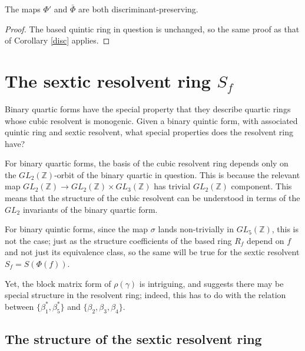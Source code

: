 \documentclass{report}
\begin{document}
\begin{corollary}
The maps $\Phi'$ and $\bar{\Phi}$ are both discriminant-preserving.
\end{corollary}
\begin{proof}
The based quintic ring in question is unchanged, so the same proof as that of Corollary \ref{disc} applies.
\end{proof}








\chapter{The sextic resolvent ring $S_f$} \label{sextic section}

Binary quartic forms have the special property that they describe quartic rings whose cubic resolvent is monogenic.  Given a binary quintic form, with associated quintic ring and sextic resolvent, what special properties does the resolvent ring have?

For binary quartic forms, the basis of the cubic resolvent ring depends only on the $GL_2(\mathbb{Z})$-orbit of the binary quartic in question.  This is because the relevant map $GL_2(\mathbb{Z}) \to GL_2(\mathbb{Z}) \times GL_3(\mathbb{Z})$ has trivial $GL_2(\mathbb{Z})$ component.  This means that the structure of the cubic resolvent can be understood in terms of the $GL_2$ invariants of the binary quartic form.

For binary quintic forms, since the map $\sigma$ lands non-trivially in $GL_5(\mathbb{Z})$, this is not the case; just as the structure coefficients of the based ring $R_f$ depend on $f$ and not just its equivalence class, so the same will be true for the sextic resolvent $S_f = S(\Phi(f))$.

Yet, the block matrix form of $\rho(\gamma)$ is intriguing, and suggests there may be special structure in the resolvent ring; indeed, this has to do with the relation between $\{ \beta_1^*, \beta_5^* \}$ and $\{ \beta_2, \beta_3, \beta_4 \}$.

\section{The structure of the sextic resolvent ring}
\end{document}

